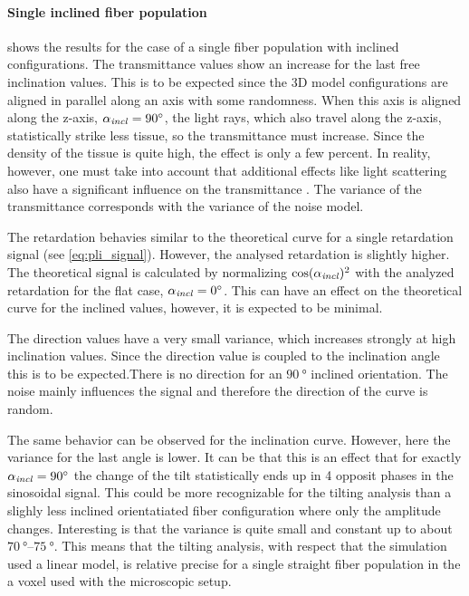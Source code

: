\paragraph{Single inclined fiber population}
 shows the results for the case of a single fiber population with inclined configurations.
The transmittance values show an increase for the last free inclination values.
This is to be expected since the 3D model configurations are aligned in parallel along an axis with some randomness.
When this axis is aligned along the z-axis, \ie{} $\textnormal{$\alpha_{\mathit{incl}}$}=\SI{90}{\degree}$, the light rays, which also travel along the z-axis, statistically strike less tissue, so the transmittance must increase.
Since the density of the tissue is quite high, the effect is only a few percent.
In reality, however, one must take into account that additional effects like light scattering also have a significant influence on the transmittance \cite{Menzel2021}.
The variance of the transmittance corresponds with the variance of the noise model.
\par
%
The retardation behavies similar to the theoretical curve for a single retardation signal (see \cref{eq:pli_signal}).
However, the analysed retardation is slightly higher.
The theoretical signal is calculated by normalizing $\cos(\textnormal{$\alpha_{\mathit{incl}}$})^2$ with the analyzed retardation for the flat case, \ie{} $\textnormal{$\alpha_{\mathit{incl}}$} = \SI{0}{\degree}$.
This can have an effect on the theoretical curve for the inclined values, however, it is expected to be minimal.
\par
%
The direction values have a very small variance, which increases strongly at high inclination values.
Since the direction value is coupled to the inclination angle this is to be expected.There is no direction for an $\SI{90}{\degree}$ inclined orientation.
The noise mainly influences the signal and therefore the direction of the  curve is random.
\par
%
The same behavior can be observed for the inclination curve.
However, here the variance for the last angle is lower.
It can be that this is an effect that for exactly $\textnormal{$\alpha_{\mathit{incl}}$}=\SI{90}{\degree}$ the change of the tilt statistically ends up in 4 opposit phases in the sinosoidal signal.
This could be more recognizable for the tilting analysis than a slighly less inclined orientatiated fiber configuration where only the amplitude changes.
Interesting is that the variance is quite small and constant up to about $\SIrange{70}{75}{\degree}$.
This means that the tilting analysis, with respect that the simulation used a linear model, is relative precise for a single straight fiber population in the a voxel used with the microscopic setup.
